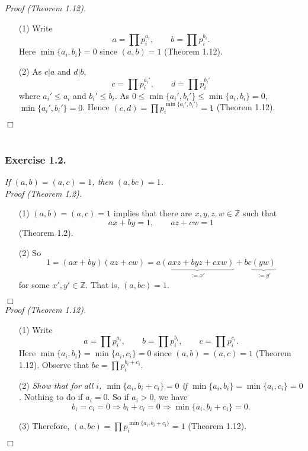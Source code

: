 \documentclass{article}
\begin{document}
\emph{Proof (Theorem 1.12).}
\begin{enumerate}
\item[(1)]
  Write
  \[
    a = \prod p_i^{a_i}, \qquad
    b = \prod p_i^{b_i}.
  \]
  Here $\min\{a_i, b_i\} = 0$ since $(a,b) = 1$ (Theorem 1.12).

\item[(2)]
  As $c|a$ and $d|b$,
  \[
    c = \prod p_i^{a_i'}, \qquad
    d = \prod p_i^{b_i'}
  \]
  where $a_i' \leq a_i$ and $b_i' \leq b_i$.
  As $0 \leq \min\{a_i', b_i'\} \leq \min\{a_i, b_i\} = 0$, $\min\{a_i', b_i'\} = 0$.
  Hence $(c,d) = \prod p_i^{\min\{a_i', b_i'\}} = 1$ (Theorem 1.12).
\end{enumerate}
$\Box$ \\\\






\subsubsection*{Exercise 1.2.}
\emph{If $(a,b) = (a,c) = 1$, then $(a,bc) = 1$.} \\



\emph{Proof (Theorem 1.2).}
\begin{enumerate}
\item[(1)]
  $(a,b) = (a,c) = 1$ implies that there are $x, y, z, w \in \mathbb{Z}$ such that
  \[
    ax + by = 1, \qquad
    az + cw = 1
  \]
  (Theorem 1.2).

\item[(2)]
  So
  \[
    1
    = (ax + by)(az + cw)
    = a\underbrace{(axz + byz + cxw)}_{:= x'} + bc\underbrace{(yw)}_{:= y'}
  \]
  for some $x', y' \in \mathbb{Z}$.
  That is, $(a,bc) = 1$.
\end{enumerate}
$\Box$ \\



\emph{Proof (Theorem 1.12).}
\begin{enumerate}
\item[(1)]
  Write
  \[
    a = \prod p_i^{a_i}, \qquad
    b = \prod p_i^{b_i}, \qquad
    c = \prod p_i^{c_i}.
  \]
  Here $\min\{a_i, b_i\} = \min\{a_i, c_i\} = 0$ since $(a,b) = (a,c) = 1$ (Theorem 1.12).
  Observe that $bc = \prod p_i^{b_i+c_i}$.

\item[(2)]
  \emph{Show that for all $i$,
  $\min\{a_i, b_i+c_i\} = 0$ if $\min\{a_i, b_i\} = \min\{a_i, c_i\} = 0$.}
  Nothing to do if $a_i = 0$.
  So if $a_i > 0$, we have
  \[
    b_i = c_i = 0
    \Longrightarrow b_i+c_i = 0
    \Longrightarrow \min\{a_i, b_i+c_i\} = 0.
  \]

\item[(3)]
  Therefore, $(a,bc) = \prod p_i^{\min\{a_i, b_i+c_i\}} = 1$ (Theorem 1.12).
\end{enumerate}
$\Box$ \\\\
\end{document}
